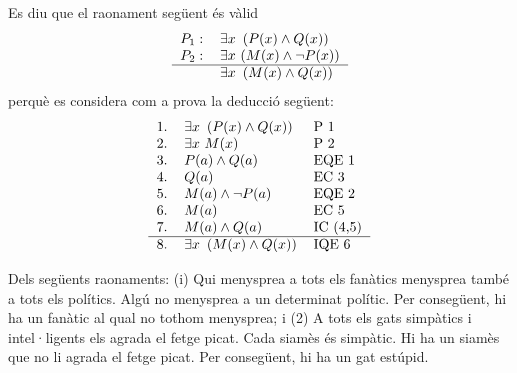 \begin{enumerate}
\pregunta Es diu que el raonament següent és vàlid%
\[%
\begin{tabular}
[c]{ll}%
$P_{1}:$ & $\exists x~\left(  P(x)\wedge Q(x)\right)  $\\
$P_{2}:$ & $\exists x$ $\left(  M(x)\wedge\lnot P(x)\right)  $\\\hline
& $\exists x~\left(  M(x)\wedge Q(x)\right)  $%
\end{tabular}
\]
perquè es considera com a prova la deducció següent:%
\[%
\begin{tabular}
[c]{lll}%
1. & $\exists x~\left(  P(x)\wedge Q(x)\right)  $ & P 1\\
2. & $\exists x$ $M(x)$ & P 2\\
3. & $P(a)\wedge Q(a)$ & EQE 1\\
4. & $Q(a)$ & EC 3\\
5. & $M(a)\wedge\lnot P(a)$ & EQE 2\\
6. & $M(a)$ & EC 5\\
7. & $M(a)\wedge Q(a)$ & IC (4,5)\\\hline
8. & $\exists x~\left(  M(x)\wedge Q(x)\right)  $ & IQE 6
\end{tabular}
\]


\begin{enumerate}
\end{enumerate}
\feedback

\pregunta Dels següents raonaments: (i) Qui menysprea a tots els fanàtics
menysprea també a tots els polítics. Algú no menysprea a un
determinat polític. Per consegüent, hi ha un fanàtic al qual no
tothom menysprea; i (2) A tots els gats simpàtics i
intel·ligents els agrada el fetge picat. Cada siamès
és simpàtic. Hi ha un siamès que no li agrada el fetge picat. Per
consegüent, hi ha un gat estúpid.

\begin{enumerate}
\end{enumerate}
\feedback
\end{enumerate}